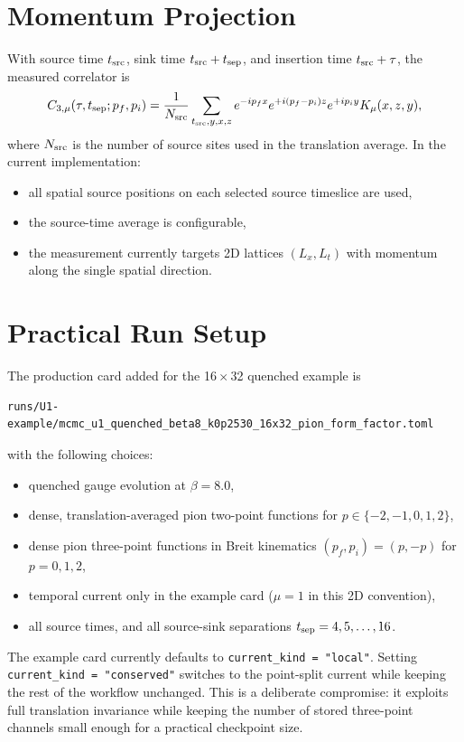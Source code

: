 \documentclass[11pt]{article}
\begin{document}
\section{Momentum Projection}
With source time $t_{\rm src}$, sink time $t_{\rm src}+t_{\rm sep}$, and
insertion time $t_{\rm src}+\tau$, the measured correlator is
\begin{equation}
  C_{3,\mu}(\tau,t_{\rm sep};p_f,p_i)
  =
  \frac{1}{N_{\rm src}}
  \sum_{t_{\rm src},y,x,z}
  e^{-ip_f x}
  e^{+i(p_f-p_i)z}
  e^{+ip_i y}
  K_\mu(x,z,y),
\end{equation}
where $N_{\rm src}$ is the number of source sites used in the translation
average. In the current implementation:
\begin{itemize}
  \item all spatial source positions on each selected source timeslice are used,
  \item the source-time average is configurable,
  \item the measurement currently targets 2D lattices $(L_x,L_t)$ with momentum
  along the single spatial direction.
\end{itemize}

\section{Practical Run Setup}
The production card added for the 16\,$\times$\,32 quenched example is
\begin{verbatim}
runs/U1-example/mcmc_u1_quenched_beta8_k0p2530_16x32_pion_form_factor.toml
\end{verbatim}
with the following choices:
\begin{itemize}
  \item quenched gauge evolution at $\beta=8.0$,
  \item dense, translation-averaged pion two-point functions for
  $p\in\{-2,-1,0,1,2\}$,
  \item dense pion three-point functions in Breit kinematics
  $(p_f,p_i)=(p,-p)$ for $p=0,1,2$,
  \item temporal current only in the example card ($\mu=1$ in this 2D convention),
  \item all source times, and all source-sink separations
  $t_{\rm sep}=4,5,\ldots,16$.
\end{itemize}
The example card currently defaults to \texttt{current\_kind = "local"}.
Setting \texttt{current\_kind = "conserved"} switches to the point-split
current while keeping the rest of the workflow unchanged.
This is a deliberate compromise: it exploits full translation invariance while
keeping the number of stored three-point channels small enough for a practical
checkpoint size.
\end{document}
